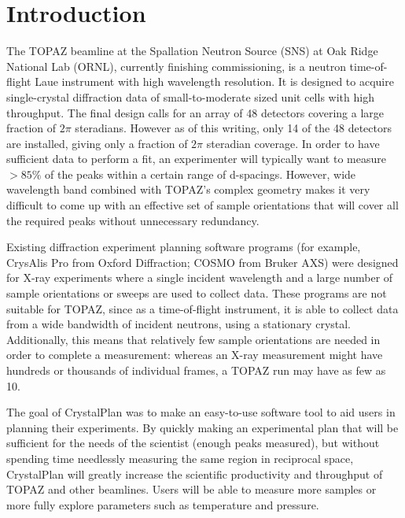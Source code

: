 \documentclass[final]{iucr}              %
\begin{document}
\section{Introduction}

The TOPAZ beamline at the Spallation Neutron Source (SNS) at Oak Ridge National
Lab (ORNL), currently finishing commissioning, is a neutron time-of-flight
Laue instrument with high wavelength resolution. It is designed to acquire
single-crystal diffraction data of small-to-moderate sized unit cells with  high
throughput. The final design calls for an array of 48 detectors covering a large
fraction of $2\pi$ steradians. However as of this writing, only 14 of the 48
detectors are installed, giving only a fraction of $2\pi$ steradian coverage. 
In order to have sufficient data to perform a fit, an experimenter will typically want
to measure $ > 85\%$ of the peaks within a certain range of d-spacings. 
However, wide wavelength band combined with TOPAZ's complex
geometry makes it very difficult to come up with an effective set of sample
orientations that will cover all the required peaks without unnecessary redundancy. 


Existing diffraction experiment planning software programs (for example,
CrysAlis Pro from Oxford Diffraction; COSMO from Bruker AXS) were designed for
X-ray experiments where a single  incident wavelength and a large number of
sample orientations or sweeps are used to collect data. 
These programs are not suitable for TOPAZ, since as a time-of-flight instrument, 
it is able to collect data from a wide bandwidth of
incident neutrons, using a stationary crystal. 
Additionally, this means that relatively few sample orientations are needed in
order to complete a measurement: whereas an X-ray measurement might have
hundreds or thousands of individual frames, a TOPAZ run may have as few as 10. 


The goal of CrystalPlan was to make an easy-to-use software tool to aid users in
planning their experiments. By quickly making an experimental plan that will be
sufficient for the needs of the scientist (enough peaks measured), but without
spending time needlessly measuring the same region in reciprocal space,
CrystalPlan will greatly increase the scientific productivity and throughput of
TOPAZ and other beamlines. Users will be able to measure more
samples or more fully explore parameters such as temperature and pressure.
 
\end{document}
